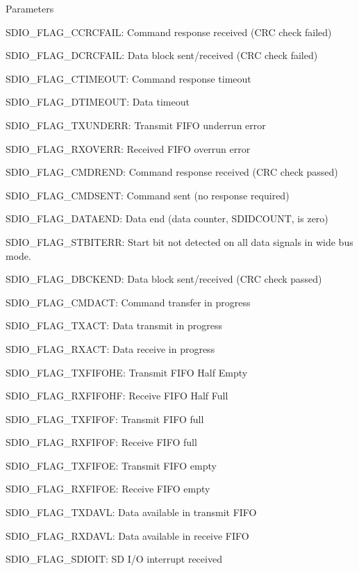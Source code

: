 \begin{DoxyParams}{Parameters}
\begin{DoxyItemize}
\item S\+D\+I\+O\+\_\+\+F\+L\+A\+G\+\_\+\+C\+C\+R\+C\+F\+A\+IL\+: Command response received (C\+RC check failed) \item S\+D\+I\+O\+\_\+\+F\+L\+A\+G\+\_\+\+D\+C\+R\+C\+F\+A\+IL\+: Data block sent/received (C\+RC check failed) \item S\+D\+I\+O\+\_\+\+F\+L\+A\+G\+\_\+\+C\+T\+I\+M\+E\+O\+UT\+: Command response timeout \item S\+D\+I\+O\+\_\+\+F\+L\+A\+G\+\_\+\+D\+T\+I\+M\+E\+O\+UT\+: Data timeout \item S\+D\+I\+O\+\_\+\+F\+L\+A\+G\+\_\+\+T\+X\+U\+N\+D\+E\+RR\+: Transmit F\+I\+FO underrun error \item S\+D\+I\+O\+\_\+\+F\+L\+A\+G\+\_\+\+R\+X\+O\+V\+E\+RR\+: Received F\+I\+FO overrun error \item S\+D\+I\+O\+\_\+\+F\+L\+A\+G\+\_\+\+C\+M\+D\+R\+E\+ND\+: Command response received (C\+RC check passed) \item S\+D\+I\+O\+\_\+\+F\+L\+A\+G\+\_\+\+C\+M\+D\+S\+E\+NT\+: Command sent (no response required) \item S\+D\+I\+O\+\_\+\+F\+L\+A\+G\+\_\+\+D\+A\+T\+A\+E\+ND\+: Data end (data counter, S\+D\+I\+D\+C\+O\+U\+NT, is zero) \item S\+D\+I\+O\+\_\+\+F\+L\+A\+G\+\_\+\+S\+T\+B\+I\+T\+E\+RR\+: Start bit not detected on all data signals in wide bus mode. \item S\+D\+I\+O\+\_\+\+F\+L\+A\+G\+\_\+\+D\+B\+C\+K\+E\+ND\+: Data block sent/received (C\+RC check passed) \item S\+D\+I\+O\+\_\+\+F\+L\+A\+G\+\_\+\+C\+M\+D\+A\+CT\+: Command transfer in progress \item S\+D\+I\+O\+\_\+\+F\+L\+A\+G\+\_\+\+T\+X\+A\+CT\+: Data transmit in progress \item S\+D\+I\+O\+\_\+\+F\+L\+A\+G\+\_\+\+R\+X\+A\+CT\+: Data receive in progress \item S\+D\+I\+O\+\_\+\+F\+L\+A\+G\+\_\+\+T\+X\+F\+I\+F\+O\+HE\+: Transmit F\+I\+FO Half Empty \item S\+D\+I\+O\+\_\+\+F\+L\+A\+G\+\_\+\+R\+X\+F\+I\+F\+O\+HF\+: Receive F\+I\+FO Half Full \item S\+D\+I\+O\+\_\+\+F\+L\+A\+G\+\_\+\+T\+X\+F\+I\+F\+OF\+: Transmit F\+I\+FO full \item S\+D\+I\+O\+\_\+\+F\+L\+A\+G\+\_\+\+R\+X\+F\+I\+F\+OF\+: Receive F\+I\+FO full \item S\+D\+I\+O\+\_\+\+F\+L\+A\+G\+\_\+\+T\+X\+F\+I\+F\+OE\+: Transmit F\+I\+FO empty \item S\+D\+I\+O\+\_\+\+F\+L\+A\+G\+\_\+\+R\+X\+F\+I\+F\+OE\+: Receive F\+I\+FO empty \item S\+D\+I\+O\+\_\+\+F\+L\+A\+G\+\_\+\+T\+X\+D\+A\+VL\+: Data available in transmit F\+I\+FO \item S\+D\+I\+O\+\_\+\+F\+L\+A\+G\+\_\+\+R\+X\+D\+A\+VL\+: Data available in receive F\+I\+FO \item S\+D\+I\+O\+\_\+\+F\+L\+A\+G\+\_\+\+S\+D\+I\+O\+IT\+: SD I/O interrupt received \item 
\end{DoxyItemize}
\end{DoxyParams}
